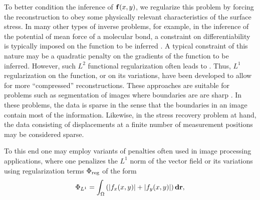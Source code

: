 \documentclass[aps,prl,reprint,groupedaddress,twocolumn]{revtex4-1}
\def\d{{\bf d}}
\def\f{{\bf f}}
\def\r{{\bf r}}
\begin{document}
To better condition the inference of $\f(x,y)$, we regularize this
problem by forcing the reconstruction to obey some physically relevant
characteristics of the surface stress. In many other types of inverse
problems, for example, in the inference of the potential of mean force
of a molecular bond, a constraint on differentiability is typically
imposed on the function to be inferred \cite{PATHDFS}. A typical
constraint of this nature may be a quadratic penalty on the gradients
of the function to be inferred.  However, such $L^{2}$ functional
regularization often leads to . Thus, $L^{1}$ regularization on the
function, or on its variations, have been developed to allow for
more ``compressed'' reconstructions. These approaches
are suitable for problems such as segmentation of images where
boundaries are are sharp \cite{CHAN}.  In these problems, the data is
sparse in the sense that the boundaries in an image contain most of
the information.  Likewise, in the stress recovery problem at hand,
the data consisting of displacements at a finite number of measurement
positions may be considered sparse.

To this end one may employ variants of penalties often used in
image processing applications, where one penalizes the $L^1$
norm of the vector field or its variations using regularization terms 
$\Phi_{\rm reg}$ of the form
%
\begin{equation}
\Phi_{L^{1}} = \int_\Omega \left(\vert f_{x}(x,y)\vert  +\vert f_{y}(x,y)\vert\right) \d\r,
\label{L10}
\end{equation} 
\end{document}
